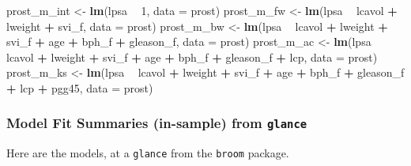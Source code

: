 \documentclass[]{book}
\newenvironment{Shaded}{\begin{snugshade}}{\end{snugshade}}
\newcommand{\KeywordTok}[1]{\textcolor[rgb]{0.13,0.29,0.53}{\textbf{#1}}}
\newcommand{\DataTypeTok}[1]{\textcolor[rgb]{0.13,0.29,0.53}{#1}}
\newcommand{\DecValTok}[1]{\textcolor[rgb]{0.00,0.00,0.81}{#1}}
\newcommand{\StringTok}[1]{\textcolor[rgb]{0.31,0.60,0.02}{#1}}
\newcommand{\OperatorTok}[1]{\textcolor[rgb]{0.81,0.36,0.00}{\textbf{#1}}}
\newcommand{\NormalTok}[1]{#1}
\theoremstyle{definition}
\theoremstyle{definition}
\theoremstyle{definition}
\theoremstyle{remark}
\begin{document}
\begin{Shaded}
\begin{Highlighting}[]
\NormalTok{prost_m_int <-}\StringTok{ }\KeywordTok{lm}\NormalTok{(lpsa }\OperatorTok{~}\StringTok{ }\DecValTok{1}\NormalTok{, }\DataTypeTok{data =}\NormalTok{ prost)}
\NormalTok{prost_m_fw <-}\StringTok{ }\KeywordTok{lm}\NormalTok{(lpsa }\OperatorTok{~}\StringTok{ }\NormalTok{lcavol }\OperatorTok{+}\StringTok{ }\NormalTok{lweight }\OperatorTok{+}\StringTok{ }\NormalTok{svi_f, }\DataTypeTok{data =}\NormalTok{ prost)}
\NormalTok{prost_m_bw <-}\StringTok{ }\KeywordTok{lm}\NormalTok{(lpsa }\OperatorTok{~}\StringTok{ }\NormalTok{lcavol }\OperatorTok{+}\StringTok{ }\NormalTok{lweight }\OperatorTok{+}\StringTok{ }\NormalTok{svi_f }\OperatorTok{+}\StringTok{ }
\StringTok{              }\NormalTok{age }\OperatorTok{+}\StringTok{ }\NormalTok{bph_f }\OperatorTok{+}\StringTok{ }\NormalTok{gleason_f, }\DataTypeTok{data =}\NormalTok{ prost)}
\NormalTok{prost_m_ac <-}\StringTok{ }\KeywordTok{lm}\NormalTok{(lpsa }\OperatorTok{~}\StringTok{ }\NormalTok{lcavol }\OperatorTok{+}\StringTok{ }\NormalTok{lweight }\OperatorTok{+}\StringTok{ }\NormalTok{svi_f }\OperatorTok{+}\StringTok{ }
\StringTok{              }\NormalTok{age }\OperatorTok{+}\StringTok{ }\NormalTok{bph_f }\OperatorTok{+}\StringTok{ }\NormalTok{gleason_f }\OperatorTok{+}\StringTok{ }\NormalTok{lcp, }\DataTypeTok{data =}\NormalTok{ prost)}
\NormalTok{prost_m_ks <-}\StringTok{ }\KeywordTok{lm}\NormalTok{(lpsa }\OperatorTok{~}\StringTok{ }\NormalTok{lcavol }\OperatorTok{+}\StringTok{ }\NormalTok{lweight }\OperatorTok{+}\StringTok{ }\NormalTok{svi_f }\OperatorTok{+}\StringTok{ }
\StringTok{              }\NormalTok{age }\OperatorTok{+}\StringTok{ }\NormalTok{bph_f }\OperatorTok{+}\StringTok{ }\NormalTok{gleason_f }\OperatorTok{+}\StringTok{ }\NormalTok{lcp }\OperatorTok{+}\StringTok{ }\NormalTok{pgg45, }\DataTypeTok{data =}\NormalTok{ prost)}
\end{Highlighting}
\end{Shaded}

\subsubsection{\texorpdfstring{Model Fit Summaries (in-sample) from
\texttt{glance}}{Model Fit Summaries (in-sample) from glance}}\label{model-fit-summaries-in-sample-from-glance}

Here are the models, at a \texttt{glance} from the \texttt{broom}
package.
\end{document}
